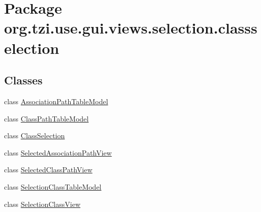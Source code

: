 \hypertarget{namespaceorg_1_1tzi_1_1use_1_1gui_1_1views_1_1selection_1_1classselection}{\section{Package org.\-tzi.\-use.\-gui.\-views.\-selection.\-classselection}
\label{namespaceorg_1_1tzi_1_1use_1_1gui_1_1views_1_1selection_1_1classselection}
}
\subsection*{Classes}
\begin{DoxyCompactItemize}
\item 
class \hyperlink{classorg_1_1tzi_1_1use_1_1gui_1_1views_1_1selection_1_1classselection_1_1_association_path_table_model}{Association\-Path\-Table\-Model}
\item 
class \hyperlink{classorg_1_1tzi_1_1use_1_1gui_1_1views_1_1selection_1_1classselection_1_1_class_path_table_model}{Class\-Path\-Table\-Model}
\item 
class \hyperlink{classorg_1_1tzi_1_1use_1_1gui_1_1views_1_1selection_1_1classselection_1_1_class_selection}{Class\-Selection}
\item 
class \hyperlink{classorg_1_1tzi_1_1use_1_1gui_1_1views_1_1selection_1_1classselection_1_1_selected_association_path_view}{Selected\-Association\-Path\-View}
\item 
class \hyperlink{classorg_1_1tzi_1_1use_1_1gui_1_1views_1_1selection_1_1classselection_1_1_selected_class_path_view}{Selected\-Class\-Path\-View}
\item 
class \hyperlink{classorg_1_1tzi_1_1use_1_1gui_1_1views_1_1selection_1_1classselection_1_1_selection_class_table_model}{Selection\-Class\-Table\-Model}
\item 
class \hyperlink{classorg_1_1tzi_1_1use_1_1gui_1_1views_1_1selection_1_1classselection_1_1_selection_class_view}{Selection\-Class\-View}
\end{DoxyCompactItemize}
